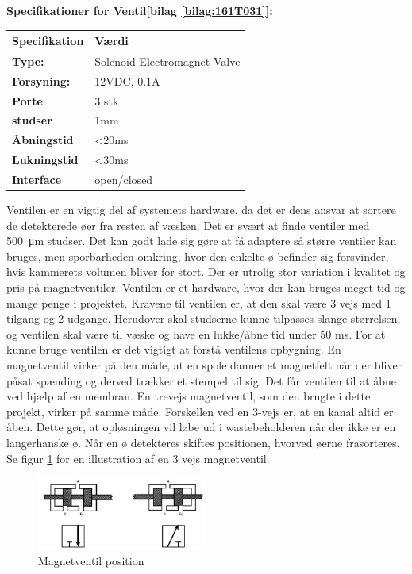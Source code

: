 \textbf{Specifikationer for Ventil[bilag \ref{bilag:161T031}]:} 
\begin{center}
		\begin{longtable}{ | m{6.5cm} | m{6.5cm}| } 
			\hline
			\textbf{Specifikation} &\textbf{Værdi} \\ 
			\hline
			\textbf{Type:} & Solenoid Electromagnet Valve \\ 
			\hline
			\textbf{Forsyning:} & 12VDC, 0.1A  \\ 
			\hline
			\textbf{Porte} & 3 stk \\ 
			\hline		
			\textbf{studser} & 1mm  \\ 
			\hline	
			\textbf{Åbningstid} & <20ms  \\ 
			\hline	
			\textbf{Lukningstid} & <30ms  \\ 
			\hline	
			\textbf{Interface} & open/closed  \\ 
			\hline	
		\end{longtable}
\end{center}
Ventilen er en vigtig del af systemets hardware, da det er dens ansvar at sortere de detekterede øer fra resten af væsken. Det er svært at finde ventiler med \SI{500}{\micro\metre} studser. Det kan godt lade sig gøre at få adaptere så større ventiler kan bruges, men sporbarheden omkring, hvor den enkelte ø befinder sig forsvinder, hvis kammerets volumen bliver for stort. Der er utrolig stor variation i kvalitet og pris på magnetventiler. Ventilen er et hardware, hvor der kan bruges meget tid og mange penge i projektet.
Kravene til ventilen er, at den skal være 3 vejs med 1 tilgang og 2 udgange. Herudover skal studserne kunne tilpasses slange størrelsen, og ventilen skal være til væske og have en lukke/åbne tid under 50 ms.
For at kunne bruge ventilen er det vigtigt at forstå ventilens opbygning. 
 En magnetventil virker på den måde, at en spole danner et magnetfelt når der bliver påsat spænding og derved trækker et stempel til sig. Det får ventilen til at åbne ved hjælp af en membran. En trevejs magnetventil, som den brugte i dette projekt, virker på samme måde. Forskellen ved en 3-vejs er, at en kanal altid er åben. Dette gør, at opløsningen vil løbe ud i wastebeholderen når der ikke er en langerhanske ø. Når en ø detekteres skiftes positionen, hvorved øerne frasorteres. Se figur \ref{fig:ventilpos} for en illustration af en 3 vejs magnetventil.

\begin{figure}[H]
	\centering
	\includegraphics[width=0.5\textwidth]{billeder/Hardware/ventil.png}
	\caption{Magnetventil position}
	\label{fig:ventilpos}
\end{figure}  


